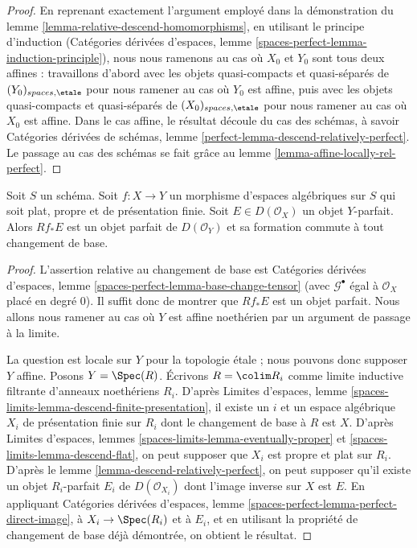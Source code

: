 \begin{proof}
\medskip\noindent
En reprenant exactement l'argument employé dans
la démonstration du lemme \ref{lemma-relative-descend-homomorphisms},
en utilisant le principe d'induction
(Catégories dérivées d'espaces, lemme
\ref{spaces-perfect-lemma-induction-principle}),
nous nous ramenons au cas où $X_0$ et $Y_0$ sont tous deux
affines : travaillons d'abord avec les objets quasi-compacts et quasi-séparés
de $(Y_0)_{spaces, \etale}$ pour nous ramener au cas où
$Y_0$ est affine, puis avec les objets quasi-compacts et quasi-séparés
de $(X_0)_{spaces, \etale}$ pour nous ramener au cas où $X_0$ est affine.
Dans le cas affine, le résultat découle du cas des schémas, à savoir
Catégories dérivées de schémas, lemme
\ref{perfect-lemma-descend-relatively-perfect}.
Le passage au cas des schémas se fait grâce au
lemme \ref{lemma-affine-locally-rel-perfect}.
\end{proof}

\begin{lemma}
\label{lemma-derived-pushforward-rel-perfect}
Soit $S$ un schéma.
Soit $f : X \to Y$ un morphisme d'espaces algébriques sur $S$
qui soit plat, propre et
de présentation finie. Soit $E \in D(\mathcal{O}_X)$ un objet $Y$-parfait.
Alors $Rf_*E$ est un objet parfait de $D(\mathcal{O}_Y)$
et sa formation commute à tout changement de base.
\end{lemma}

\begin{proof}
L'assertion relative au changement de base est Catégories dérivées d'espaces,
lemme \ref{spaces-perfect-lemma-base-change-tensor} (avec
$\mathcal{G}^\bullet$ égal à $\mathcal{O}_X$ placé en degré $0$).
Il suffit donc de montrer que $Rf_*E$ est un objet parfait. Nous allons nous ramener
au cas où $Y$ est affine noethérien par un argument de passage à la limite.

\medskip\noindent
La question est locale sur $Y$ pour la topologie \'etale ; nous pouvons donc supposer $Y$ affine.
Posons $Y = \Spec(R)$. Écrivons $R = \colim R_i$ comme limite inductive filtrante
d'anneaux noethériens $R_i$. D'après Limites d'espaces, lemme
\ref{spaces-limits-lemma-descend-finite-presentation},
il existe un $i$ et un espace algébrique
$X_i$ de présentation finie sur $R_i$
dont le changement de base à $R$ est $X$. D'après
Limites d'espaces, lemmes \ref{spaces-limits-lemma-eventually-proper} et
\ref{spaces-limits-lemma-descend-flat},
on peut supposer que $X_i$ est propre et plat sur $R_i$.
D'après le lemme \ref{lemma-descend-relatively-perfect},
on peut supposer qu'il existe un objet $R_i$-parfait $E_i$ de
$D(\mathcal{O}_{X_i})$ dont l'image inverse sur $X$ est $E$.
En appliquant Catégories dérivées d'espaces,
lemme \ref{spaces-perfect-lemma-perfect-direct-image},
à $X_i \to \Spec(R_i)$ et à $E_i$, et en utilisant la propriété de
changement de base déjà démontrée, on obtient le résultat.
\end{proof}

